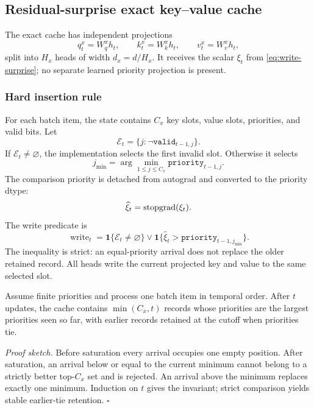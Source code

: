 \subsection{Residual-surprise exact key--value cache}
\label{subsec:exact-cache}

The exact cache has independent projections
\begin{equation}
  q_t^x=W_q^x h_t,\qquad
  k_t^x=W_k^x h_t,\qquad
  v_t^x=W_v^x h_t,
  \label{eq:exact-cache-projections}
\end{equation}
split into \(H_x\) heads of width \(d_x=d/H_x\).  It receives the scalar
\(\xi_t\) from \eqref{eq:write-surprise}; no separate learned priority
projection is present.

\subsubsection{Hard insertion rule}

For each batch item, the state contains \(C_x\) key slots, value slots,
priorities, and valid bits.  Let
\begin{equation}
  \mathcal E_t
  =
  \{j:\neg\texttt{valid}_{t-1,j}\}.
\end{equation}
If \(\mathcal E_t\neq\varnothing\), the implementation selects the first
invalid slot.  Otherwise it selects
\begin{equation}
  j_{\min}
  =
  \arg\min_{1\leq j\leq C_x}
  \texttt{priority}_{t-1,j}.
\end{equation}
The comparison priority is detached from autograd and converted to the
priority dtype:
\begin{equation}
  \widehat\xi_t=\operatorname{stopgrad}(\xi_t).
\end{equation}
The write predicate is
\begin{equation}
  \operatorname{write}_t
  =
  \mathbf{1}\{\mathcal E_t\neq\varnothing\}
  \lor
  \mathbf{1}\{
    \widehat\xi_t>
    \texttt{priority}_{t-1,j_{\min}}
  \}.
  \label{eq:exact-cache-write}
\end{equation}
The inequality is strict: an equal-priority arrival does not replace the
older retained record.  All heads write the current projected key and value to
the same selected slot.

\begin{proposition}
\label{prop:top-cx}
Assume finite priorities and process one batch item in temporal order.  After
\(t\) updates, the cache contains \(\min(C_x,t)\) records whose priorities are
the largest priorities seen so far, with earlier records retained at the
cutoff when priorities tie.
\end{proposition}
\noindent\emph{Proof sketch.}
Before saturation every arrival occupies one empty position.  After
saturation, an arrival below or equal to the current minimum cannot belong to
a strictly better top-\(C_x\) set and is rejected.  An arrival above the
minimum replaces exactly one minimum.  Induction on \(t\) gives the invariant;
strict comparison yields stable earlier-tie retention. \hfill\(\square\)

